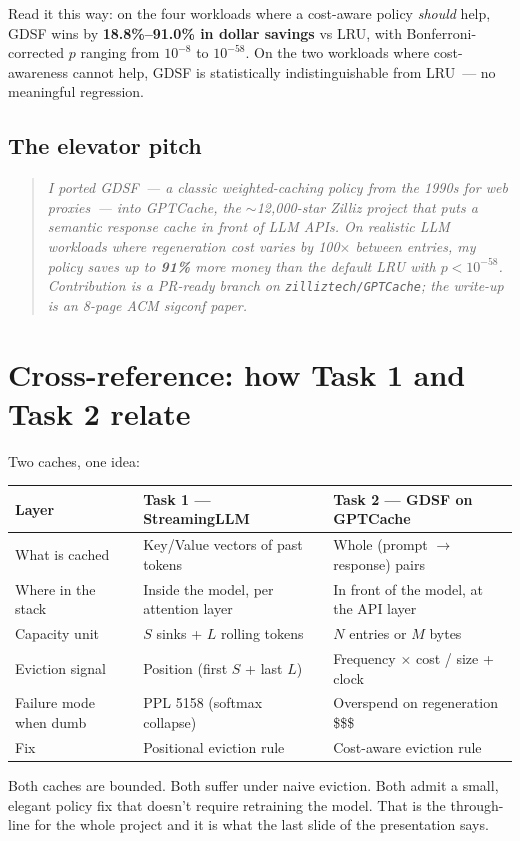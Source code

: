 \documentclass[11pt,a4paper]{article}
\begin{document}
Read it this way: on the four workloads where a cost-aware policy
\emph{should} help, GDSF wins by \textbf{18.8\%--91.0\% in dollar
savings} vs LRU, with Bonferroni-corrected $p$ ranging from $10^{-8}$ to
$10^{-58}$. On the two workloads where cost-awareness cannot help, GDSF
is statistically indistinguishable from LRU~--- no meaningful
regression.

\subsection{The elevator pitch}
\begin{quote}\itshape
I ported GDSF~--- a classic weighted-caching policy from the 1990s for
web proxies~--- into GPTCache, the $\sim$12{,}000-star Zilliz project
that puts a semantic response cache in front of LLM APIs. On realistic
LLM workloads where regeneration cost varies by 100$\times$ between
entries, my policy saves up to \textbf{91\%} more money than the default
LRU with $p < 10^{-58}$. Contribution is a PR-ready branch on
\texttt{zilliztech/GPTCache}; the write-up is an 8-page ACM sigconf
paper.
\end{quote}

\section*{Cross-reference: how Task 1 and Task 2 relate}
Two caches, one idea:

\begin{center}
\small
\begin{tabular}{p{2.4cm} p{5.2cm} p{5.5cm}}
\toprule
\textbf{Layer} & \textbf{Task 1 --- StreamingLLM} & \textbf{Task 2 --- GDSF on GPTCache} \\
\midrule
What is cached
  & Key/Value vectors of past tokens
  & Whole (prompt $\to$ response) pairs \\
Where in the stack
  & Inside the model, per attention layer
  & In front of the model, at the API layer \\
Capacity unit
  & $S$ sinks + $L$ rolling tokens
  & $N$ entries or $M$ bytes \\
Eviction signal
  & Position (first $S$ + last $L$)
  & Frequency $\times$ cost / size + clock \\
Failure mode when dumb
  & PPL 5158 (softmax collapse)
  & Overspend on regeneration \$\$\$ \\
Fix
  & Positional eviction rule
  & Cost-aware eviction rule \\
\bottomrule
\end{tabular}
\end{center}

Both caches are bounded. Both suffer under naive eviction. Both admit a
small, elegant policy fix that doesn't require retraining the model.
That is the through-line for the whole project and it is what the last
slide of the presentation says.
\end{document}
